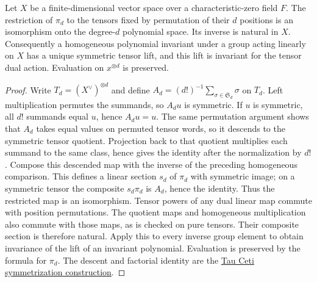 \begin{lemma}
\label{lem:polynomial-symmetric-lift}
\leanok
Let $X$ be a finite-dimensional vector space over a characteristic-zero
field $F$. The restriction of $\pi_d$ to the tensors fixed by permutation
of their $d$ positions is an isomorphism onto the degree-$d$ polynomial
space. Its inverse is natural in $X$. Consequently a homogeneous
polynomial invariant under a group acting linearly on $X$ has a unique
symmetric tensor lift, and this lift is invariant for the tensor dual
action. Evaluation on $x^{\otimes d}$ is preserved.
\end{lemma}
\begin{proof}
Write $T_d=(X^\vee)^{\otimes d}$ and define
$A_d=(d!)^{-1}\sum_{\sigma\in\mathfrak S_d}\sigma$ on $T_d$.
Left multiplication permutes the summands, so $A_du$ is symmetric.
If $u$ is symmetric, all $d!$ summands equal $u$, hence $A_du=u$.
The same permutation argument shows that $A_d$ takes equal values on
permuted tensor words, so it descends to the symmetric tensor quotient.
Projection back to that quotient multiplies each summand to the same
class, hence gives the identity after the normalization by $d!$.
Compose this descended map with the inverse of the preceding homogeneous
comparison. This defines a linear section $s_d$ of $\pi_d$ with symmetric
image; on a symmetric tensor the composite $s_d\pi_d$ is $A_d$, hence
the identity. Thus the restricted map is an isomorphism.
Tensor powers of any dual linear map commute with position permutations.
The quotient maps and homogeneous multiplication also commute with those
maps, as is checked on pure tensors. Their composite section is therefore
natural. Apply this to every inverse group element to obtain invariance
of the lift of an invariant polynomial. Evaluation is preserved by the
formula for $\pi_d$. The descent and factorial identity are the
\href{https://github.com/TauCetiProject/TauCeti/blob/3c3a32baea963db05c302adeb307b22baae4de78/TauCeti/LinearAlgebra/SymmetricPower/Basic.lean}{Tau Ceti symmetrization construction}.
\end{proof}

